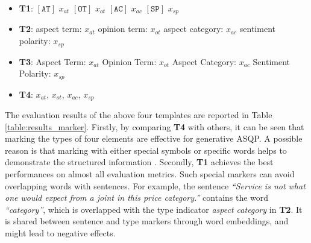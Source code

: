 \documentclass[11pt]{article}
\begin{document}
\begin{itemize}
    \item \textbf{T1}: $\mathtt{[AT]}$ $x_{at}$ $\mathtt{[OT]}$ $x_{ot}$ $\mathtt{[AC]}$ $x_{ac}$ $\mathtt{[SP]}$ $x_{sp}$
    \item \textbf{T2}: aspect term: $x_{at}$ opinion term: $x_{ot}$ aspect category: $x_{ac}$ sentiment polarity: $x_{sp}$
    \item \textbf{T3}: Aspect Term: $x_{at}$ Opinion Term: $x_{ot}$ Aspect Category: $x_{ac}$ Sentiment Polarity: $x_{sp}$
    \item \textbf{T4}: $x_{at}$, $x_{ot}$, $x_{ac}$, $x_{sp}$
\end{itemize}

The evaluation results of the above four templates are reported in Table \ref{table:results_marker}. Firstly, by comparing \textbf{T4} with others, it can be seen that marking the types of four elements are effective for generative ASQP. A possible reason is that marking with either special symbols or specific words helps to demonstrate the structured information \cite{paolini2021structured}. Secondly, \textbf{T1} achieves the best performances on almost all evaluation metrics. Such special markers can avoid overlapping words with sentences. For example, the sentence \emph{``Service is not what one would expect from a joint in this price category.''} contains the word \emph{``category''}, which is overlapped with the type indicator \emph{aspect category} in \textbf{T2}. It is shared between sentence and type markers through word embeddings, and might lead to negative effects.

\begin{table}[]
\small
    \centering
    \caption{Evaluation results of special marker.}
    \label{table:results_marker}
\end{table}
\end{document}
